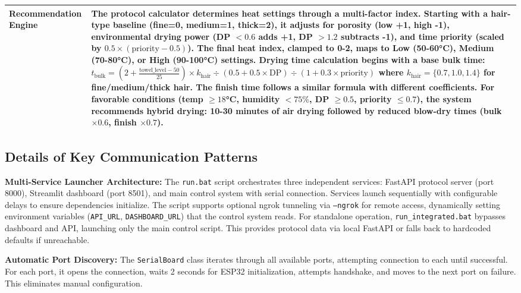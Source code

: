 \documentclass[11pt,a4paper]{article}
\begin{document}
\begin{longtable}{|p{}|p{}|}
\hline
Recommendation Engine & The protocol calculator determines heat settings through a multi-factor index. Starting with a hair-type baseline (fine=0, medium=1, thick=2), it adjusts for porosity (low +1, high -1), environmental drying power (DP $< 0.6$ adds +1, DP $> 1.2$ subtracts -1), and time priority (scaled by $0.5 \times (\text{priority} - 0.5)$). The final heat index, clamped to 0-2, maps to Low (50-60°C), Medium (70-80°C), or High (90-100°C) settings. Drying time calculation begins with a base bulk time: $t_{\text{bulk}} = \left(2 + \frac{\text{towel\_level} - 50}{25}\right) \times k_{\text{hair}} \div \left(0.5 + 0.5 \times \text{DP}\right) \div \left(1 + 0.3 \times \text{priority}\right)$ where $k_{\text{hair}} = \{0.7, 1.0, 1.4\}$ for fine/medium/thick hair. The finish time follows a similar formula with different coefficients. For favorable conditions (temp $\geq 18$°C, humidity $< 75\%$, DP $\geq 0.5$, priority $\leq 0.7$), the system recommends hybrid drying: 10-30 minutes of air drying followed by reduced blow-dry times (bulk $\times 0.6$, finish $\times 0.7$). \\
\hline
\end{longtable}

\subsection{Details of Key Communication Patterns}

\textbf{Multi-Service Launcher Architecture:} The \texttt{run.bat} script orchestrates three independent services: FastAPI protocol server (port 8000), Streamlit dashboard (port 8501), and main control system with serial connection. Services launch sequentially with configurable delays to ensure dependencies initialize. The script supports optional ngrok tunneling via \texttt{--ngrok} for remote access, dynamically setting environment variables (\texttt{API\_URL}, \texttt{DASHBOARD\_URL}) that the control system reads. For standalone operation, \texttt{run\_integrated.bat} bypasses dashboard and API, launching only the main control script. This provides protocol data via local FastAPI or falls back to hardcoded defaults if unreachable.

\textbf{Automatic Port Discovery:} The \texttt{SerialBoard} class iterates through all available ports, attempting connection to each until successful. For each port, it opens the connection, waits 2 seconds for ESP32 initialization, attempts handshake, and moves to the next port on failure. This eliminates manual configuration.
\end{document}
